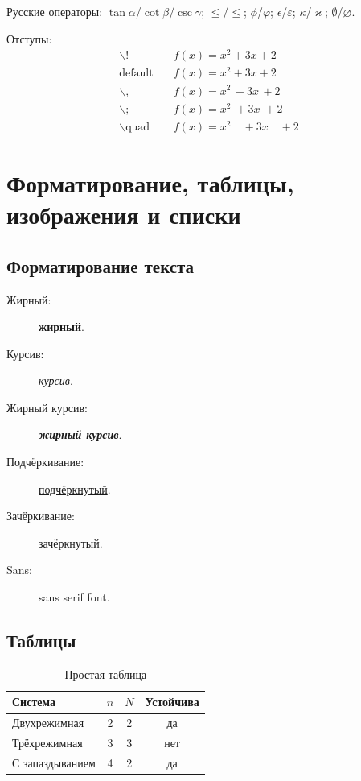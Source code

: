 \documentclass[font=modern]{cmcmsuthesis-doctoral}
\begin{document}
Русские операторы: $\tan\alpha$/$\cot\beta$/$\csc\gamma$; $\le$/$\leqslant$; $\phi$/$\varphi$; $\epsilon$/$\varepsilon$; $\kappa$/$\varkappa$; $\emptyset$/$\varnothing$.

Отступы:
\[\begin{aligned}\backslash!&\quad f(x)=x^2\!+3x\!+2\\\text{default}&\quad f(x)=x^2+3x+2\\\backslash,&\quad f(x)=x^2\,+3x\,+2\\\backslash;&\quad f(x)=x^2\;+3x\;+2\\\backslash\text{quad}&\quad f(x)=x^2\quad+3x\quad+2\end{aligned}\]

\chapter{Форматирование, таблицы, изображения и списки}

\section{Форматирование текста}
\begin{description}
\item[Жирный:] \textbf{жирный}.\item[Курсив:] \emph{курсив}.
\item[Жирный курсив:] \textbf{\emph{жирный курсив}}.
\item[Подчёркивание:] \underline{подчёркнутый}.
\item[Зачёркивание:] \sout{зачёркнутый}.
\item[Sans:] \textsf{sans serif font}.
\end{description}

\section{Таблицы}
\begin{table}[htbp]\caption{Простая таблица}\label{tab:simple}\centering
\begin{tabular}{|l|c|c|c|}\hline Система&$n$&$N$&Устойчива\\\hline
Двухрежимная&2&2&да\\\hline Трёхрежимная&3&3&нет\\\hline
С запаздыванием&4&2&да\\\hline
\end{tabular}\end{table}
\end{document}

